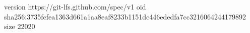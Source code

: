 version https://git-lfs.github.com/spec/v1
oid sha256:3735fcfea1363d661a1aa8eaf8233b1151dc446ededfa7cc3216064244179892
size 22020

